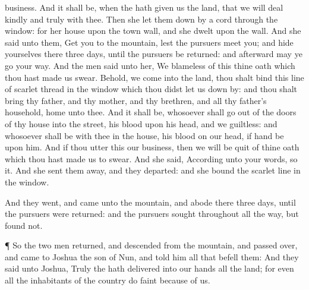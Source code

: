 {business. And it shall be, when the
{} hath
given us the
land, that we will
deal
kindly and
truly with thee.
Then she let them
down by a
cord
through the
window: for her
house
{} upon the
town
wall, and she
dwelt upon the
wall.
And she
said unto them,
Get you to the
mountain, lest the
pursuers
meet you; and
hide yourselves there
three
days, until the
pursuers be
returned: and
afterward may ye
go your
way.
And the
men
said unto her, We
{}
blameless of this thine
oath which thou hast made us
swear.
Behold,
{} we
come into the
land, thou shalt
bind this
line of
scarlet
thread in the
window which thou didst let us down
by: and thou shalt
bring thy
father, and thy
mother, and thy
brethren, and all thy
father’s
household,
home unto thee.
And it shall be,
{}
whosoever shall go
out of the
doors of thy
house into the
street, his
blood
{} upon his
head, and we
{}
guiltless: and whosoever shall be with thee in the
house, his
blood
{} on our
head, if
{}
hand be upon him.
And if thou
utter this our
business, then we will be
quit of thine
oath which thou hast made us to
swear.
And she
said, According unto your
words, so
{} it. And she sent them
away, and they
departed: and she
bound the
scarlet
line in the
window.
\par }{\PP {}And they
went, and
came unto the
mountain, and
abode there
three
days, until the
pursuers were
returned: and the
pursuers
sought
{} throughout all the
way, but
found
{} not.
\par }{\PP {}¶ So the
two
men
returned, and
descended from the
mountain, and passed
over, and
came to
Joshua the
son of
Nun, and
told him all
{} that
befell them:
And they
said unto
Joshua,
Truly the
{} hath
delivered into our
hands all the
land; for even all the
inhabitants of the
country do
faint
because of us.

}

